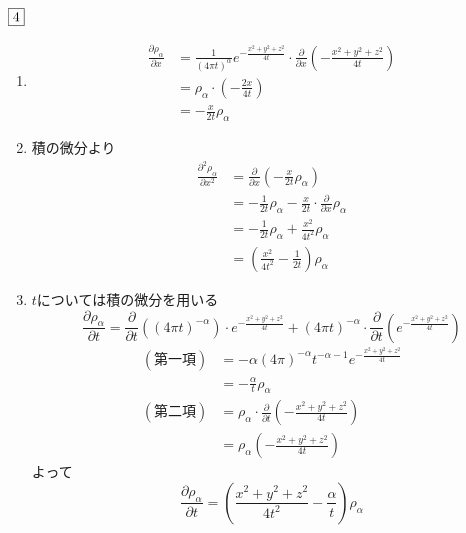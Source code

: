 \begin{souanswer} %
	$\fbox{4}$
\begin{enumerate}
	\item 
\begin{align*}
	\frac{\partial \rho_\alpha}{\partial x}
	&= \frac{1}{(4\pi t)^\alpha}e^{-\frac{x^2+ y^2+ z^2}{4t}}\cdot \frac{\partial}{\partial x}\left(-\frac{x^2+ y^2+ z^2}{4t}\right)\\
	&= \rho_\alpha\cdot\left(-\frac{2x}{4t}\right)\\
	&= -\frac{x}{2t}\rho_\alpha
\end{align*}

	\item 積の微分より
\begin{align*}
	\frac{\partial^2 \rho_\alpha}{\partial x^2}
	&= \frac{\partial}{\partial x}\left(-\frac{x}{2t}\rho_\alpha\right)\\
	&= -\frac{1}{2t}\rho_\alpha- \frac{x}{2t}\cdot \frac{\partial}{\partial x}\rho_\alpha\\
	&= -\frac{1}{2t}\rho_\alpha+ \frac{x^2}{4t^2}\rho_\alpha\\
	&= \left(\frac{x^2}{4t^2}- \frac{1}{2t}\right)\rho_\alpha
\end{align*}

	\item $t$については積の微分を用いる
\begin{equation*}
	\frac{\partial \rho_\alpha}{\partial t}
	= \frac{\partial}{\partial t}((4\pi t)^{-\alpha})\cdot e^{-\frac{x^2+ y^2+ z^2}{4t}}+ (4\pi t)^{-\alpha}\cdot \frac{\partial}{\partial t}\left(e^{-\frac{x^2+ y^2+ z^2}{4t}}\right)
\end{equation*}
\begin{align*}
	(第一項)
	&= -\alpha(4\pi)^{-\alpha}t^{-\alpha- 1}e^{-\frac{x^2+ y^2+ z^2}{4t}}\\
	&= -\frac{\alpha}{t}\rho_\alpha\\
	(第二項)
	&= \rho_\alpha\cdot \frac{\partial}{\partial t}\left({-\frac{x^2+ y^2+ z^2}{4t}}\right)\\
	&= \rho_\alpha\left({-\frac{x^2+ y^2+ z^2}{4t}}\right)
\end{align*}
	よって
\begin{equation*}
	\frac{\partial \rho_\alpha}{\partial t}= \left(\frac{x^2+ y^2+ z^2}{4t^2}- \frac{\alpha}{t}\right)\rho_\alpha
\end{equation*}


\end{enumerate}
\end{souanswer}
